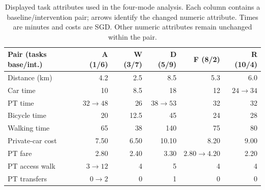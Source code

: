 \begin{table}[pos=htbp]
\centering\small
\caption{Displayed task attributes used in the four-mode analysis. Each column contains a baseline/intervention pair; arrows identify the changed numeric attribute. Times are minutes and costs are SGD. Other numeric attributes remain unchanged within the pair.}
\label{tab:survey_tasks}
\begin{tabular}{@{}lrrrrr@{}}
\toprule
Pair (tasks base/int.) & A (1/6) & W (3/7) & D (5/9) & F (8/2) & R (10/4) \\
\midrule
Distance (km) & 4.2 & 2.5 & 8.5 & 5.3 & 6.0 \\
Car time & 10 & 8.5 & 18 & 12 & $24\to34$ \\
PT time & $32\to48$ & 26 & $38\to53$ & 32 & 32 \\
Bicycle time & 20 & 12.5 & 45 & 24 & 28 \\
Walking time & 65 & 38 & 140 & 75 & 80 \\
Private-car cost & 7.50 & 6.50 & 10.10 & 8.20 & 9.00 \\
PT fare & 2.80 & 2.40 & 3.30 & $2.80\to4.20$ & 2.20 \\
PT access walk & $3\to12$ & 4 & 5 & 4 & 4 \\
PT transfers & $0\to2$ & 0 & 1 & 0 & 0 \\
\bottomrule
\end{tabular}
\par{}
\end{table}